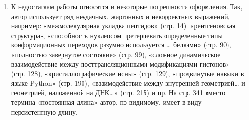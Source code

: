 \begin{frame}[allowframebreaks]
\begin{enumerate}
        \item  К недостаткам работы относятся и некоторые погрешности оформления. Так, автор использует ряд неудачных, жаргонных и некорректных выражений, например: «межмолекулярная укладка пептидов» (стр. 14), «рентгеновская структура», «способность нуклеосом претерпевать определенные типы конформационных переходов разумно используется … белками» (стр. 90), «полностью завернутое состояние» (стр. 99), «сложное динамическое взаимодействие между посттрансляционными модификациями гистонов» (стр. 128), «кристаллографические ионы» (стр. 129), «продвинутые навыки в языке Python» (стр. 190), «взаимодействие между внутренней геометрией… и геометрией, наложенной на ДНК…» (стр. 215) и пр. На стр. 341 вместо термина «постоянная длина» автор, по-видимому, имеет в виду персистентную длину. 

    \end{enumerate}
\end{frame}

